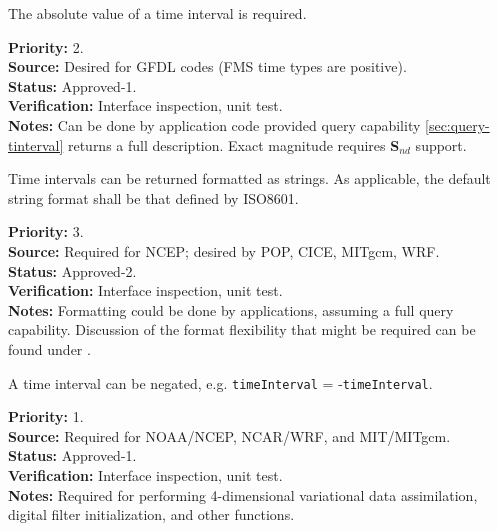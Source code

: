 The absolute value of a time interval is required.
\begin{reqlist}
{\bf Priority:} 2. \\
{\bf Source:} Desired for GFDL codes (FMS time types are positive). \\
{\bf Status:} Approved-1. \\
{\bf Verification:} Interface inspection, unit test. \\
{\bf Notes:}  Can be done by application code provided query capability 
\ref{sec:query-tinterval} returns a full description. 
Exact magnitude requires 
{\bf S$_{nd}$} support.
\end{reqlist}

Time intervals can be returned formatted as strings.  As applicable, the
default string format shall be that defined by ISO8601.
\begin{reqlist}
{\bf Priority:} 3. \\ 
{\bf Source:} Required for NCEP; desired by POP, CICE, MITgcm, WRF. \\
{\bf Status:} Approved-2. \\
{\bf Verification:} Interface inspection, unit test. \\
{\bf Notes:}  Formatting could be done by applications, assuming a full query 
capability.  Discussion of the format flexibility that might be required can be 
found under \cite{javaCalendar}.
\end{reqlist}

A time interval can be negated, e.g. {\tt timeInterval} = -{\tt timeInterval}.
\begin{reqlist}
{\bf Priority:} 1. \\
{\bf Source:} Required for NOAA/NCEP, NCAR/WRF, and MIT/MITgcm. \\
{\bf Status:} Approved-1. \\
{\bf Verification:} Interface inspection, unit test. \\
{\bf Notes:} Required for performing 4-dimensional variational data assimilation, digital filter initialization, and other functions.
\end{reqlist}

\label{req:time_instants}
\label{req:ti}

